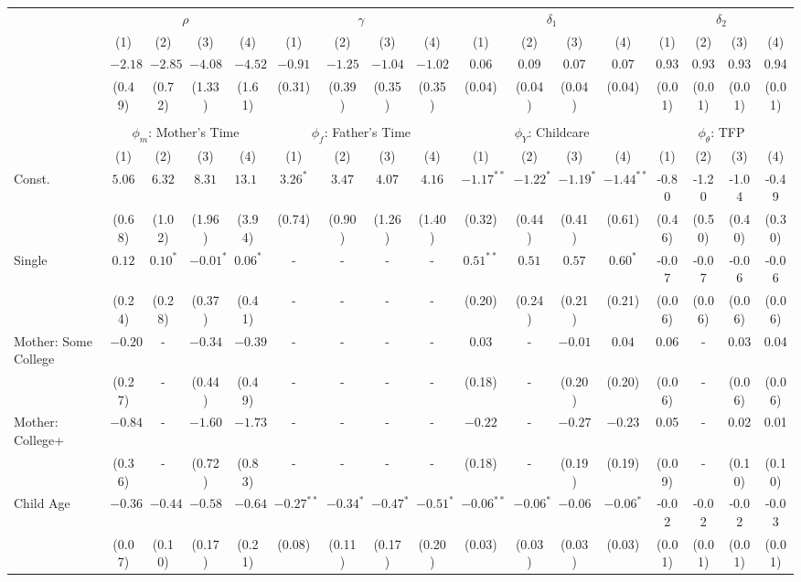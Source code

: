 \begin{tabular}{lcccccccccccccccc}\\\toprule
 & \multicolumn{4}{c}{$\rho$} & \multicolumn{4}{c}{$\gamma$} & \multicolumn{4}{c}{$\delta_{1}$} & \multicolumn{4}{c}{$\delta_{2}$} \\
&(1)&(2)&(3)&(4)&(1)&(2)&(3)&(4)&(1)&(2)&(3)&(4)&(1)&(2)&(3)&(4)\\\cmidrule(r){2-5}\cmidrule(r){6-9}\cmidrule(r){10-13}\cmidrule(r){14-17}
&$-2.18$&$-2.85$&$-4.08$&$-4.52$&$-0.91$&$-1.25$&$-1.04$&$-1.02$&0.06&0.09&0.07&0.07&0.93&0.93&0.93&0.94\\
&(0.49)&(0.72)&(1.33)&(1.61)&(0.31)&(0.39)&(0.35)&(0.35)&(0.04)&(0.04)&(0.04)&(0.04)&(0.01)&(0.01)&(0.01)&(0.01)\\
&&&&&&&&&&&&&&&&\\
 & \multicolumn{4}{c}{$\phi_{m}$: Mother's Time} & \multicolumn{4}{c}{$\phi_{f}$: Father's Time} & \multicolumn{4}{c}{$\phi_{Y}$: Childcare} & \multicolumn{4}{c}{$\phi_{\theta}$: TFP} \\
&(1)&(2)&(3)&(4)&(1)&(2)&(3)&(4)&(1)&(2)&(3)&(4)&(1)&(2)&(3)&(4)\\\cmidrule(r){2-5}\cmidrule(r){6-9}\cmidrule(r){10-13}\cmidrule(r){14-17}
Const.&$5.06$&$6.32$&$8.31$&$13.13$&$3.26^{*}$&$3.47$&$4.07$&$4.16$&$-1.17^{**}$&$-1.22^{*}$&$-1.19^{*}$&$-1.44^{**}$&-0.80&-1.20&-1.04&-0.49\\
&(0.68)&(1.02)&(1.96)&(3.94)&(0.74)&(0.90)&(1.26)&(1.40)&(0.32)&(0.44)&(0.41)&(0.61)&(0.46)&(0.50)&(0.40)&(0.30)\\
Single&$0.12$&$0.10^{*}$&$-0.01^{*}$&$0.06^{*}$&-&-&-&-&$0.51^{**}$&$0.51$&$0.57$&$0.60^{*}$&-0.07&-0.07&-0.06&-0.06\\
&(0.24)&(0.28)&(0.37)&(0.41)&-&-&-&-&(0.20)&(0.24)&(0.21)&(0.21)&(0.06)&(0.06)&(0.06)&(0.06)\\
Mother: Some College&$-0.20$&-&$-0.34$&$-0.39$&-&-&-&-&$0.03$&-&$-0.01$&$0.04$&0.06&-&0.03&0.04\\
&(0.27)&-&(0.44)&(0.49)&-&-&-&-&(0.18)&-&(0.20)&(0.20)&(0.06)&-&(0.06)&(0.06)\\
Mother: College+&$-0.84$&-&$-1.60$&$-1.73$&-&-&-&-&$-0.22$&-&$-0.27$&$-0.23$&0.05&-&0.02&0.01\\
&(0.36)&-&(0.72)&(0.83)&-&-&-&-&(0.18)&-&(0.19)&(0.19)&(0.09)&-&(0.10)&(0.10)\\
Child Age&$-0.36$&$-0.44$&$-0.58$&$-0.64$&$-0.27^{**}$&$-0.34^{*}$&$-0.47^{*}$&$-0.51^{*}$&$-0.06^{**}$&$-0.06^{*}$&$-0.06$&$-0.06^{*}$&-0.02&-0.02&-0.02&-0.03\\
&(0.07)&(0.10)&(0.17)&(0.21)&(0.08)&(0.11)&(0.17)&(0.20)&(0.03)&(0.03)&(0.03)&(0.03)&(0.01)&(0.01)&(0.01)&(0.01)\\

\end{tabular}
